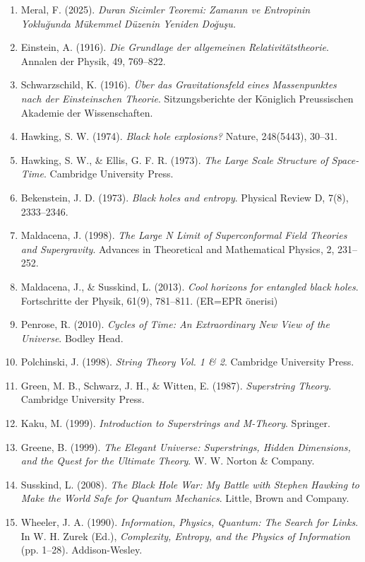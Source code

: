 \documentclass[12pt,a4paper]{article}
\begin{document}
\begin{enumerate}
\item Meral, F. (2025). \textit{Duran Sicimler Teoremi: Zamanın ve Entropinin Yokluğunda Mükemmel Düzenin Yeniden Doğuşu.}
\item Einstein, A. (1916). \textit{Die Grundlage der allgemeinen Relativitätstheorie}. Annalen der Physik, 49, 769–822.
\item Schwarzschild, K. (1916). \textit{\"Uber das Gravitationsfeld eines Massenpunktes nach der Einsteinschen Theorie}. Sitzungsberichte der Königlich Preussischen Akademie der Wissenschaften.
\item Hawking, S. W. (1974). \textit{Black hole explosions?} Nature, 248(5443), 30–31.
\item Hawking, S. W., \& Ellis, G. F. R. (1973). \textit{The Large Scale Structure of Space-Time}. Cambridge University Press.
\item Bekenstein, J. D. (1973). \textit{Black holes and entropy}. Physical Review D, 7(8), 2333–2346.
\item Maldacena, J. (1998). \textit{The Large N Limit of Superconformal Field Theories and Supergravity}. Advances in Theoretical and Mathematical Physics, 2, 231–252.
\item Maldacena, J., \& Susskind, L. (2013). \textit{Cool horizons for entangled black holes}. Fortschritte der Physik, 61(9), 781–811. (ER=EPR önerisi)
\item Penrose, R. (2010). \textit{Cycles of Time: An Extraordinary New View of the Universe}. Bodley Head.
\item Polchinski, J. (1998). \textit{String Theory Vol. 1 \& 2}. Cambridge University Press.
\item Green, M. B., Schwarz, J. H., \& Witten, E. (1987). \textit{Superstring Theory}. Cambridge University Press.
\item Kaku, M. (1999). \textit{Introduction to Superstrings and M-Theory}. Springer.
\item Greene, B. (1999). \textit{The Elegant Universe: Superstrings, Hidden Dimensions, and the Quest for the Ultimate Theory}. W. W. Norton \& Company.
\item Susskind, L. (2008). \textit{The Black Hole War: My Battle with Stephen Hawking to Make the World Safe for Quantum Mechanics}. Little, Brown and Company.
\item Wheeler, J. A. (1990). \textit{Information, Physics, Quantum: The Search for Links}. In W. H. Zurek (Ed.), \textit{Complexity, Entropy, and the Physics of Information} (pp. 1–28). Addison-Wesley.

\end{enumerate}
\end{document}
